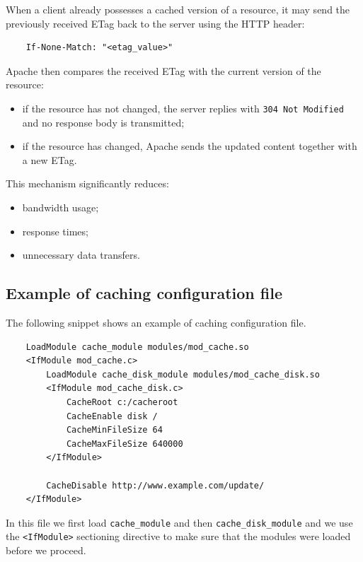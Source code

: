 \documentclass{scrbook}
\begin{document}
	When a client already possesses a cached version of a resource, it may send the previously received ETag back to the server using the HTTP header:
	
	\begin{lstlisting}
	If-None-Match: "<etag_value>"
	\end{lstlisting}
	
	Apache then compares the received ETag with the current version of the resource:
	\begin{itemize}
		\item
		if the resource has not changed, the server replies with \texttt{304 Not Modified} and no response body is transmitted;
		
		\item
		if the resource has changed, Apache sends the updated content together with a new ETag.
	\end{itemize}
	
	This mechanism significantly reduces:
	\begin{itemize}
		\item
		bandwidth usage;
		
		\item
		response times;
		
		\item
		unnecessary data transfers.
	\end{itemize}
	
	\subsection{Example of caching configuration file}
	
	The following snippet shows an example of caching configuration file.
	
	\begin{lstlisting}
	LoadModule cache_module modules/mod_cache.so
	<IfModule mod_cache.c>
		LoadModule cache_disk_module modules/mod_cache_disk.so
		<IfModule mod_cache_disk.c>
			CacheRoot c:/cacheroot
			CacheEnable disk /
			CacheMinFileSize 64
			CacheMaxFileSize 640000
		</IfModule>
		
		CacheDisable http://www.example.com/update/
	</IfModule>
	\end{lstlisting}
	
	In this file we first load \texttt{cache\_module} and then \texttt{cache\_disk\_module} and we use the \texttt{<IfModule>} sectioning directive to make sure that the modules were loaded before we proceed.\\
	
\end{document}

